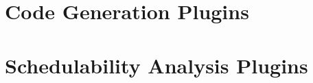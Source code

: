 \documentclass[12pt,a4paper,normalheadings,titlepage]{scrreprt}
\begin{document}
\maketitle

\tableofcontents{}



\part{Code Generation Plugins}






\part{Schedulability Analysis Plugins}



\appendix







\end{document}
